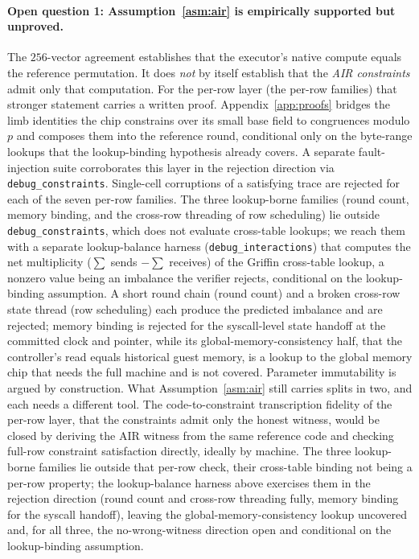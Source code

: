 \paragraph{Open question 1: Assumption~\ref{asm:air} is empirically supported but unproved.}
The $256$-vector agreement establishes that the executor's native compute equals the reference permutation. It does \emph{not} by itself establish that the \emph{AIR constraints} admit only that computation. For the per-row layer (the per-row families) that stronger statement carries a written proof. Appendix~\ref{app:proofs} bridges the limb identities the chip constrains over its small base field to congruences modulo $p$ and composes them into the reference round, conditional only on the byte-range lookups that the lookup-binding hypothesis already covers. A separate fault-injection suite corroborates this layer in the rejection direction via \texttt{debug\_constraints}. Single-cell corruptions of a satisfying trace are rejected for each of the seven per-row families. The three lookup-borne families (round count, memory binding, and the cross-row threading of row scheduling) lie outside \texttt{debug\_constraints}, which does not evaluate cross-table lookups; we reach them with a separate lookup-balance harness (\texttt{debug\_interactions}) that computes the net multiplicity ($\sum$ sends $-\sum$ receives) of the Griffin cross-table lookup, a nonzero value being an imbalance the verifier rejects, conditional on the lookup-binding assumption. A short round chain (round count) and a broken cross-row state thread (row scheduling) each produce the predicted imbalance and are rejected; memory binding is rejected for the syscall-level state handoff at the committed clock and pointer, while its global-memory-consistency half, that the controller's read equals historical guest memory, is a lookup to the global memory chip that needs the full machine and is not covered. Parameter immutability is argued by construction. What Assumption~\ref{asm:air} still carries splits in two, and each needs a different tool. The code-to-constraint transcription fidelity of the per-row layer, that the constraints admit only the honest witness, would be closed by deriving the AIR witness from the same reference code and checking full-row constraint satisfaction directly, ideally by machine. The three lookup-borne families lie outside that per-row check, their cross-table binding not being a per-row property; the lookup-balance harness above exercises them in the rejection direction (round count and cross-row threading fully, memory binding for the syscall handoff), leaving the global-memory-consistency lookup uncovered and, for all three, the no-wrong-witness direction open and conditional on the lookup-binding assumption.

